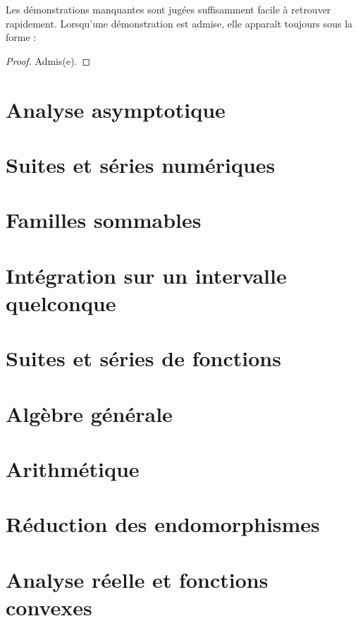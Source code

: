 \documentclass{report}
\begin{document}
Les démonstrations manquantes sont jugées suffisamment facile à retrouver rapidement. Lorsqu'une démonstration est admise, elle apparaît toujours sous la forme :

\begin{proof}
    Admis(e).
\end{proof}

\newpage

\pagestyle{main}

\chapter{Analyse asymptotique}

\chapter{Suites et séries numériques}

\chapter{Familles sommables}

\chapter{Intégration sur un intervalle quelconque}

\chapter{Suites et séries de fonctions}

\chapter{Algèbre générale}



\chapter{Arithmétique}

\chapter{Réduction des endomorphismes}

\chapter{Analyse réelle et fonctions convexes}
\end{document}
